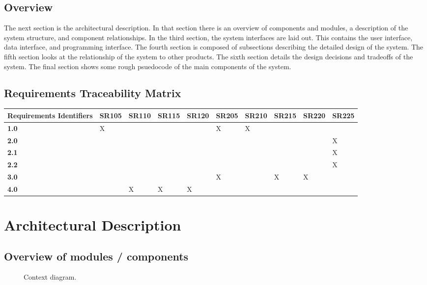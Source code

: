 \documentclass{article}
\begin{document}
\subsection{Overview}
The next section is the architectural description. In that section there is
an overview of components and modules, a description of the system
structure, and component relationships. In the third section, the system
interfaces are laid out. This contains the user interface, data interface,
and programming interface. The fourth section is composed of subsections
describing the detailed design of the system. The fifth section looks at the
relationship of the system to other products. The sixth section details the
design decisions and tradeoffs of the system. The final section shows some
rough psuedocode of the main components of the system.

\subsection{Requirements Traceability Matrix}
\begin{tabular}{ | l | l | l | l | l | l | l | l | l | l |}
\hline
\textbf{Requirements Identifiers} & SR105 & SR110 & SR115 & SR120 & SR205 & SR210 & SR215 & SR220 & SR225 \\ \hline
\textbf{1.0} & X &  &  &  & X & X &  &  & \\ \hline
\textbf{2.0} &  &  &  & &  &  &  &  & X \\ \hline
\textbf{2.1} &  &  &  & &  &  &  &  & X \\ \hline
\textbf{2.2} &  &  &  & &  &  &  &  & X \\ \hline
\textbf{3.0} &  &  &  &  & X &  & X & X & \\ \hline
\textbf{4.0} &  & X & X & X &  &  &  &  & \\ \hline
\end{tabular}

\newpage

\section{Architectural Description}

\subsection{Overview of modules / components}

\begin{figure}[h!]
    \centering
    \resizebox{\textwidth}{!}{
        
    }
    \caption{Context diagram.}
    \label{fig:dfd-context}
\end{figure}
\end{document}
